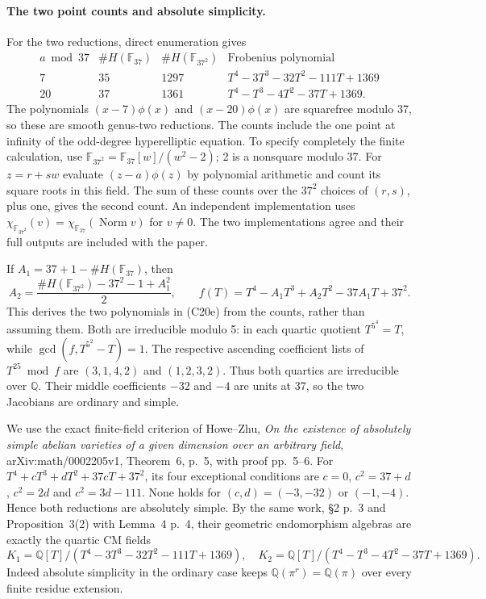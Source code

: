 \documentclass[11pt]{article}
\newcommand{\Q}{\mathbb Q}\newcommand{\C}{\mathbb C}\newcommand{\Z}{\mathbb Z}\newcommand{\R}{\mathbb R}\newcommand{\A}{\mathbb A}\newcommand{\OO}{\mathcal O}
\newcommand{\F}{\mathbb F}
\theoremstyle{definition}\newtheorem{definition}[theorem]{Definition}\newtheorem{remark}[theorem]{Remark}
\begin{document}
\paragraph{The two point counts and absolute simplicity.}
For the two reductions, direct enumeration gives
\[
\begin{array}{c|r|r|l}
 a\bmod37 & \#H(\F_{37}) & \#H(\F_{37^2})
                    &\text{Frobenius polynomial}\\ \hline
 7 &35&1297&T^4-3T^3-32T^2-111T+1369\\
 20&37&1361&T^4-T^3-4T^2-37T+1369 .
\end{array}
 \tag{C20e}
\]
The polynomials $(x-7)\phi(x)$ and $(x-20)\phi(x)$ are
squarefree modulo 37, so these are smooth genus-two reductions.
The counts include the one point at infinity of the odd-degree
hyperelliptic equation. To specify completely the finite
calculation, use
$\F_{37^2}=\F_{37}[w]/(w^2-2)$; 2 is a nonsquare modulo 37.
For $z=r+sw$ evaluate $(z-a)\phi(z)$ by polynomial arithmetic
and count its square roots in this field. The sum of these
counts over the $37^2$ choices of $(r,s)$, plus one, gives the
second count. An independent implementation uses
$\chi_{\F_{37^2}}(v)=
\chi_{\F_{37}}(\operatorname{Norm}v)$ for $v\ne0$.
The two implementations agree and their full outputs are
included with the paper.

If $A_1=37+1-\#H(\F_{37})$, then
\[
 A_2=\frac{\#H(\F_{37^2})-37^2-1+A_1^2}{2},
 \qquad
 f(T)=T^4-A_1T^3+A_2T^2-37A_1T+37^2.
\]
This derives the two polynomials in (C20e) from the counts,
rather than assuming them. Both are irreducible modulo 5:
in each quartic quotient $T^{5^4}=T$, while
$\gcd(f,T^{5^2}-T)=1$. The respective ascending coefficient
lists of $T^{25}\bmod f$ are $(3,1,4,2)$ and $(1,2,3,2)$.
Thus both quartics are irreducible over $\Q$.
Their middle coefficients $-32$ and $-4$ are units at 37,
so the two Jacobians are ordinary and simple.

We use the exact finite-field criterion of Howe--Zhu,
\emph{On the existence of absolutely simple abelian varieties
of a given dimension over an arbitrary field},
arXiv:math/0002205v1, Theorem~6, p.~5, with proof pp.~5--6.
For $T^4+cT^3+dT^2+37cT+37^2$, its four exceptional
conditions are
$c=0$, $c^2=37+d$, $c^2=2d$ and $c^2=3d-111$.
None holds for $(c,d)=(-3,-32)$ or $(-1,-4)$.
Hence both reductions are absolutely simple.
By the same work, \S2 p.~3 and Proposition~3(2) with
Lemma~4 p.~4, their geometric endomorphism algebras are
exactly the quartic CM fields
\[
 K_1=\Q[T]/(T^4-3T^3-32T^2-111T+1369),\quad
 K_2=\Q[T]/(T^4-T^3-4T^2-37T+1369).
 \tag{C20f}
\]
Indeed absolute simplicity in the ordinary case keeps
$\Q(\pi^r)=\Q(\pi)$ over every finite residue extension.
\end{document}
